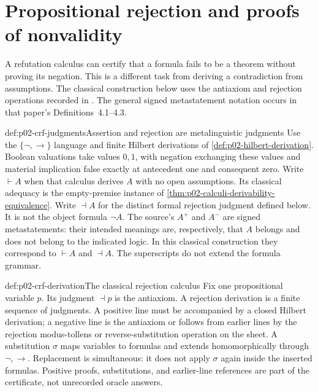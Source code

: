 \section{Propositional rejection and proofs of nonvalidity}
\label{sec:p02-classical-rejection}

A refutation calculus can certify that a formula fails to be a theorem
without proving its negation. This is a different task from deriving a
contradiction from assumptions. The classical construction below uses
the antiaxiom and rejection operations recorded in
\cite[\S1, pp.~68--69]{Citkin2013JankovRefutation}. The general signed
metastatement notation occurs in that paper's Definitions~4.1--4.3.

\begin{hbdefinition}{def:p02-crf-judgments}{Assertion and rejection are metalinguistic judgments}
Use the \(\{\neg,\to\}\) language and finite Hilbert derivations of
\cref{def:p02-hilbert-derivation}. Boolean valuations take values
\(0,1\), with negation exchanging these values and material implication
false exactly at antecedent one and consequent zero.
Write \(\vdash A\) when that
calculus derives \(A\) with no open assumptions. Its classical adequacy
is the empty-premise instance of
\cref{thm:p02-calculi-derivability-equivalence}.
Write \(\dashv A\) for the distinct formal rejection judgment defined
below. It is not the object formula \(\neg A\).
The source's \(A^{+}\) and \(A^{-}\) are signed metastatements:
their intended meanings are, respectively, that \(A\) belongs and does
not belong to the indicated logic. In this classical construction they
correspond to \(\vdash A\) and \(\dashv A\). The superscripts do not
extend the formula grammar.
\end{hbdefinition}

\begin{hbdefinition}{def:p02-crf-derivation}{The classical rejection calculus}
Fix one propositional variable \(p\). Its judgment \(\dashv p\) is
the antiaxiom. A rejection derivation is a finite sequence of judgments.
A positive line must be accompanied by a closed Hilbert derivation;
a negative line is the antiaxiom or follows from earlier lines by the
rejection modus-tollens or reverse-substitution operation on the sheet.
A substitution \(\sigma\) maps variables to formulas and extends
homomorphically through \(\neg,\to\). Replacement is simultaneous:
it does not apply \(\sigma\) again inside the inserted formulas.
Positive proofs, substitutions, and earlier-line references are part
of the certificate, not unrecorded oracle answers.
\end{hbdefinition}

